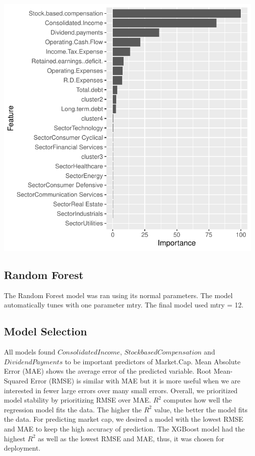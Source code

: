 \documentclass[11pt,]{article}
\begin{document}
\begin{center}\includegraphics{stock_analysis_files/figure-latex/gradient boosting-1} \end{center}

\hypertarget{random-forest}{%
\subsection{Random Forest}\label{random-forest}}

The Random Forest model was ran using its normal parameters. The model
automatically tunes with one parameter mtry. The final model used mtry =
12.

\hypertarget{model-selection}{%
\subsection{Model Selection}\label{model-selection}}

All models found \(Consolidated Income\), \(Stock based Compensation\)
and \(Dividend Payments\) to be important predictors of Market.Cap. Mean
Absolute Error (MAE) shows the average error of the predicted variable.
Root Mean-Squared Error (RMSE) is similar with MAE but it is more useful
when we are interested in fewer large errors over many small errors.
Overall, we prioritized model stability by prioritizing RMSE over MAE.
\(R^2\) computes how well the regression model fits the data. The higher
the \(R^2\) value, the better the model fits the data. For predicting
market cap, we desired a model with the lowest RMSE and MAE to keep the
high accuracy of prediction. The XGBoost model had the highest \(R^2\)
as well as the lowest RMSE and MAE, thus, it was chosen for deployment.
\end{document}
